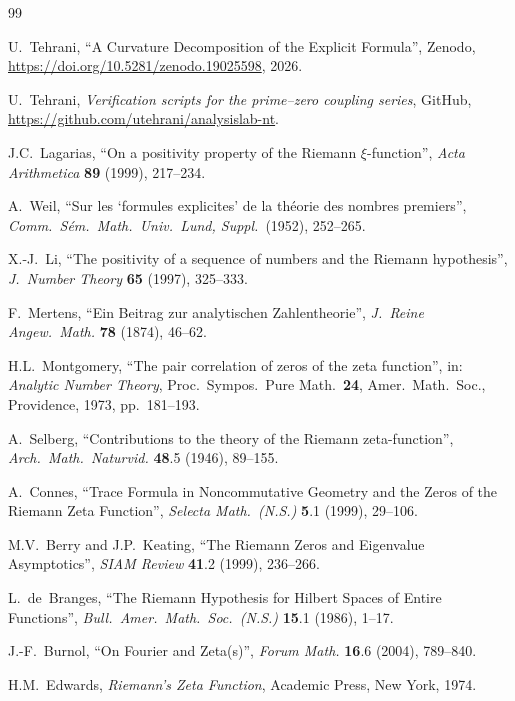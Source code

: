 \documentclass[11pt]{article}
\begin{document}
\newpage
\begin{thebibliography}{99}

U.~Tehrani,
``A Curvature Decomposition of the Explicit Formula'',
Zenodo, \url{https://doi.org/10.5281/zenodo.19025598}, 2026.

U.~Tehrani,
\emph{Verification scripts for the prime--zero coupling series},
GitHub, \url{https://github.com/utehrani/analysislab-nt}.

J.C.~Lagarias,
``On a positivity property of the Riemann $\xi$-function'',
\emph{Acta Arithmetica} \textbf{89} (1999), 217--234.

A.~Weil,
``Sur les `formules explicites' de la th\'eorie des nombres
premiers'',
\emph{Comm.\ S\'em.\ Math.\ Univ.\ Lund, Suppl.}\ (1952),
252--265.

X.-J.~Li,
``The positivity of a sequence of numbers and the Riemann
hypothesis'',
\emph{J.\ Number Theory} \textbf{65} (1997), 325--333.

F.~Mertens,
``Ein Beitrag zur analytischen Zahlentheorie'',
\emph{J.\ Reine Angew.\ Math.} \textbf{78} (1874), 46--62.

H.L.~Montgomery,
``The pair correlation of zeros of the zeta function'',
in: \emph{Analytic Number Theory},
Proc.\ Sympos.\ Pure Math.\ \textbf{24},
Amer.\ Math.\ Soc., Providence, 1973, pp.~181--193.

A.~Selberg,
``Contributions to the theory of the Riemann zeta-function'',
\emph{Arch.\ Math.\ Naturvid.} \textbf{48}.5 (1946), 89--155.

A.~Connes,
``Trace Formula in Noncommutative Geometry and the Zeros of the
Riemann Zeta Function'',
\emph{Selecta Math.\ (N.S.)} \textbf{5}.1 (1999), 29--106.

M.V.~Berry and J.P.~Keating,
``The Riemann Zeros and Eigenvalue Asymptotics'',
\emph{SIAM Review} \textbf{41}.2 (1999), 236--266.

L.~de~Branges,
``The Riemann Hypothesis for Hilbert Spaces of Entire Functions'',
\emph{Bull.\ Amer.\ Math.\ Soc.\ (N.S.)} \textbf{15}.1 (1986),
1--17.

J.-F.~Burnol,
``On Fourier and Zeta(s)'',
\emph{Forum Math.} \textbf{16}.6 (2004), 789--840.

H.M.~Edwards,
\emph{Riemann's Zeta Function},
Academic Press, New York, 1974.

\end{thebibliography}
\end{document}
